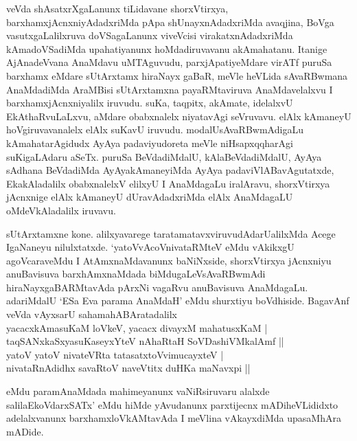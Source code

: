 \begin{artha}
veVda shAsatxrXgaLanunx tiLidavane shorxVtirxya, barxhamxjAcnxniyAdadxriMda pApa shUnayxnAdadxriMda avaqjina, BoVga vasutxgaLalilxruva doVSagaLanunx viveVcisi virakatxnAdadxriMda kAmadoVSadiMda upahatiyanunx hoMdadiruvavanu akAmahatanu. Itanige AjAnadeVvana AnaMdavu uMTAguvudu, parxjApatiyeMdare virATf puruSa barxhamx eMdare sUtArxtamx hiraNayx gaBaR, meVle heVLida sAvaRBwmana AnaMdadiMda AraMBisi sUtArxtamxna payaRMtaviruva AnaMdavelalxvu I barxhamxjAcnxniyalilx iruvudu. suKa, taqpitx, akAmate, idelalxvU EkAthaRvuLaLxvu, aMdare obabxnalelx niyatavAgi seVruvavu. elAlx kAmaneyU hoVgiruvavanalelx elAlx suKavU iruvudu. modalU\break sAvaRBwmAdigaLu kAmahatarAgidudx AyAya padaviyudoreta meVle niHsapxqqharAgi suKigaLAdaru aSeTx. puruSa BeVdadiMdalU, kAlaBeVdadiMdalU, AyAya sAdhana BeVdadiMda AyAyakAmaneyiMda AyAya padaviVlABavAgutatxde, EkakAladalilx obabxnalelxV elilxyU I AnaMdagaLu iralAravu, shorxVtirxya jAcnxnige elAlx kAmaneyU dUravAdadxriMda elAlx AnaMdagaLU oMdeVkAladalilx iruvavu.
\end{artha}


\begin{artha}
sUtArxtamxne kone. alilxyavarege taratamatavxviruvudAdarU\break alilxMda Acege IgaNaneyu nilulxtatxde. `yatoVvAcoVnivataRMteV eMdu vAkikxgU agoVcaraveMdu I AtAmxnaMdavanunx baNiNxside, shorxVtirxya jAcnxniyu anuBavisuva barxhAmxnaMdada biMdugaLeV\break sAvaRBwmAdi hiraNayxgaBARMtavAda pArxNi vagaRvu anuBavisuva AnaMdagaLu. adariMdalU `ESa Eva parama AnaMdaH' eMdu shurxtiyu boVdhiside. BagavAnf veVda vAyxsarU saha\break mahABAratadalilx\\
yacacxkAmasuKaM loVkeV, yacacx divayxM mahatusxKaM |\\
taqSANxkaSxyasuKaseyxYteV nAhaRtaH SoVDashiVMkalAmf ||\\
yatoV yatoV nivateVRta tatasatxtoVvimucayxteV |\\
nivataRnAdidhx savaRtoV naveVtitx duHKa maNavxpi ||
\end{artha}%

\begin{artha}
eMdu paramAnaMdada mahimeyanunx vaNiRsiruvaru alalxde salilaEkoVdarxSATx' eMdu hiMde yAvudanunx parxtijecnx mADi\break heVLididxto adelalxvanunx barxhamxloVkAMtavAda I meVlina vAkayxdiMda upasaMhAra mADide. 
\end{artha}

